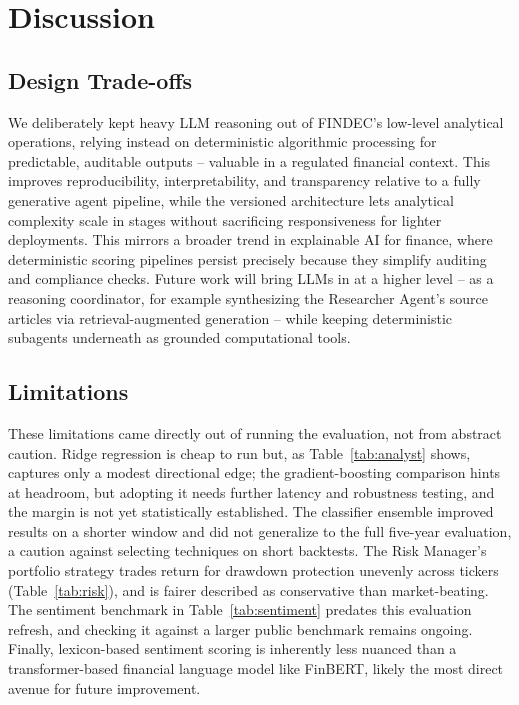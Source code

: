 \documentclass[conference]{IEEEtran}
\begin{document}
\section{Discussion}
\label{sec:discussion}

\subsection{Design Trade-offs}

We deliberately kept heavy LLM reasoning out of FINDEC's low-level analytical operations, relying instead on deterministic algorithmic processing for predictable, auditable outputs -- valuable in a regulated financial context. This improves reproducibility, interpretability, and transparency relative to a fully generative agent pipeline, while the versioned architecture lets analytical complexity scale in stages without sacrificing responsiveness for lighter deployments. This mirrors a broader trend in explainable AI for finance, where deterministic scoring pipelines persist precisely because they simplify auditing and compliance checks. Future work will bring LLMs in at a higher level -- as a reasoning coordinator, for example synthesizing the Researcher Agent's source articles via retrieval-augmented generation -- while keeping deterministic subagents underneath as grounded computational tools.

\subsection{Limitations}

These limitations came directly out of running the evaluation, not from abstract caution. Ridge regression is cheap to run but, as Table~\ref{tab:analyst} shows, captures only a modest directional edge; the gradient-boosting comparison hints at headroom, but adopting it needs further latency and robustness testing, and the margin is not yet statistically established. The classifier ensemble improved results on a shorter window and did not generalize to the full five-year evaluation, a caution against selecting techniques on short backtests. The Risk Manager's portfolio strategy trades return for drawdown protection unevenly across tickers (Table~\ref{tab:risk}), and is fairer described as conservative than market-beating. The sentiment benchmark in Table~\ref{tab:sentiment} predates this evaluation refresh, and checking it against a larger public benchmark remains ongoing. Finally, lexicon-based sentiment scoring is inherently less nuanced than a transformer-based financial language model like FinBERT, likely the most direct avenue for future improvement.
\end{document}
